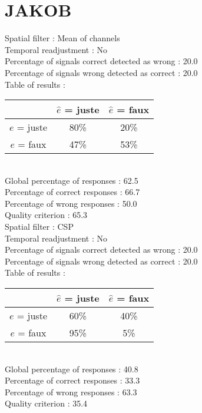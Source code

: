 \section*{JAKOB}
Spatial filter : Mean of channels \\
Temporal readjustment : No \\
Percentage of signals correct detected as wrong :   20.0 \\
Percentage of signals wrong detected as correct :   20.0 \\
Table of results : \\
\begin{tabular}{|c|c|c|}
\hline				& $\hat{e}$ = juste & $\hat{e}$ = faux \\
\hline  $e$ = juste	&     80\%			&     20\%		\\
\hline  $e$ = faux	&     47\%			&     53\%		\\
\hline
\end{tabular}\\
Global percentage of responses :   62.5 \\
Percentage of correct responses :   66.7 \\
Percentage of wrong responses :   50.0 \\
Quality criterion :   65.3 \\

Spatial filter : CSP \\
Temporal readjustment : No \\
Percentage of signals correct detected as wrong :   20.0 \\
Percentage of signals wrong detected as correct :   20.0 \\
Table of results : \\
\begin{tabular}{|c|c|c|}
\hline				& $\hat{e}$ = juste & $\hat{e}$ = faux \\
\hline  $e$ = juste	&     60\%			&     40\%		\\
\hline  $e$ = faux	&     95\%			&      5\%		\\
\hline
\end{tabular}\\
Global percentage of responses :   40.8 \\
Percentage of correct responses :   33.3 \\
Percentage of wrong responses :   63.3 \\
Quality criterion :   35.4 \\

